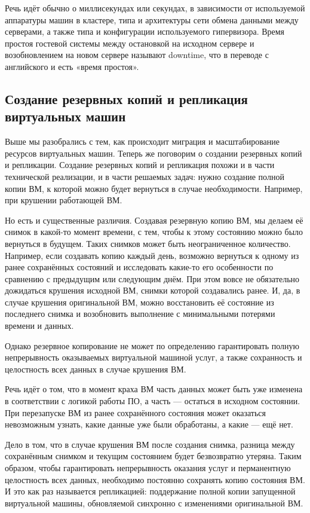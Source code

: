 \documentclass[14pt, a4paper]{article}
\begin{document}
Речь идёт обычно о миллисекундах или секундах, в зависимости от используемой аппаратуры машин
в кластере, типа и архитектуры сети обмена данными между серверами, а также типа и конфигурации
используемого гипервизора. Время простоя гостевой системы между остановкой на исходном сервере
и возобновлением на новом сервере называют downtime, что в переводе с английского и есть «время
простоя».\\

\subsection*{Создание резервных копий и репликация виртуальных машин}

Выше мы разобрались с тем, как происходит миграция и масштабирование ресурсов виртуальных
машин. Теперь же поговорим о создании резервных копий и репликации. Создание резервных копий и
репликация похожи и в части технической реализации, и в части решаемых задач: нужно создание
полной копии ВМ, к которой можно будет вернуться в случае необходимости. Например, при крушении
работающей ВМ.

Но есть и существенные различия. Создавая резервную копию ВМ, мы делаем её снимок в какой-то
момент времени, с тем, чтобы к этому состоянию можно было вернуться в будущем. Таких снимков
может быть неограниченное количество. Например, если создавать копию каждый день, возможно
вернуться к одному из ранее сохранённых состояний и исследовать какие-то его особенности по
сравнению с предыдущим или следующим днём. При этом вовсе не обязательно дожидаться
крушения исходной ВМ, снимки которой создавались ранее. И, да, в случае крушения оригинальной
ВМ, можно восстановить её состояние из последнего снимка и возобновить выполнение с
минимальными потерями времени и данных.

Однако резервное копирование не может по определению гарантировать полную непрерывность
оказываемых виртуальной машиной услуг, а также сохранность и целостность всех данных в случае
крушения ВМ.

Речь идёт о том, что в момент краха ВМ часть данных может быть уже изменена в соответствии с
логикой работы ПО, а часть — остаться в исходном состоянии. При перезапуске ВМ из ранее
сохранённого состояния может оказаться невозможным узнать, какие данные уже были обработаны, а
какие — ещё нет.

Дело в том, что в случае крушения ВМ после создания снимка, разница между сохранённым снимком
и текущим состоянием будет безвозвратно утеряна. Таким образом, чтобы гарантировать
непрерывность оказания услуг и перманентную целостность всех данных, необходимо постоянно
сохранять копию состояния ВМ. И это как раз называется репликацией: поддержание полной копии
запущенной виртуальной машины, обновляемой синхронно с изменениями оригинальной ВМ.
\end{document}
